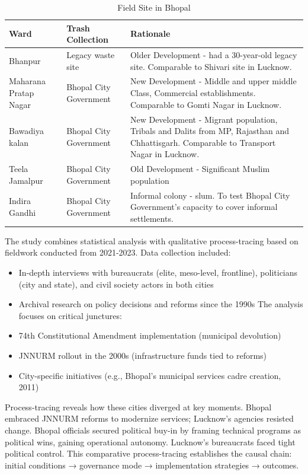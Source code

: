 \begin{table}[htbp]
\centering
\caption{Field Site in Bhopal}
\begin{tabular}{lll}
\hline
\textbf{Ward} & \textbf{Trash Collection} & \textbf{Rationale} \\
\hline
Bhanpur & Legacy waste site & Older Development - had a 30-year-old legacy site. Comparable to Shivari site in Lucknow. \\
\hline
Maharana Pratap Nagar & Bhopal City Government & New Development - Middle and upper middle Class, Commercial establishments. Comparable to Gomti Nagar in Lucknow. \\
\hline
Bawadiya kalan & Bhopal City Government & New Development - Migrant population, Tribals and Dalits from MP, Rajasthan and Chhattisgarh. Comparable to Transport Nagar in Lucknow. \\
\hline
Teela Jamalpur & Bhopal City Government & Old Development - Significant Muslim population \\
\hline
Indira Gandhi & Bhopal City Government & Informal colony - slum. To test Bhopal City Government's capacity to cover informal settlements. \\
\hline
\end{tabular}
\label{tab:bhopal}
\end{table}

The study combines statistical analysis with qualitative process-tracing based on fieldwork conducted from 2021-2023. Data collection included:

\begin{itemize}
\item In-depth interviews with bureaucrats (elite, meso-level, frontline), politicians (city and state), and civil society actors in both cities
\item Archival research on policy decisions and reforms since the 1990s The analysis focuses on critical junctures:
\item 74th Constitutional Amendment implementation (municipal devolution)
\item JNNURM rollout in the 2000s (infrastructure funds tied to reforms)
\item City-specific initiatives (e.g., Bhopal's municipal services cadre creation, 2011)
\end{itemize}

Process-tracing reveals how these cities diverged at key moments. Bhopal embraced JNNURM reforms to modernize services; Lucknow's agencies resisted change. Bhopal officials secured political buy-in by framing technical programs as political wins, gaining operational autonomy. Lucknow's bureaucrats faced tight political control. This comparative process-tracing establishes the causal chain: initial conditions → governance mode → implementation strategies → outcomes.


